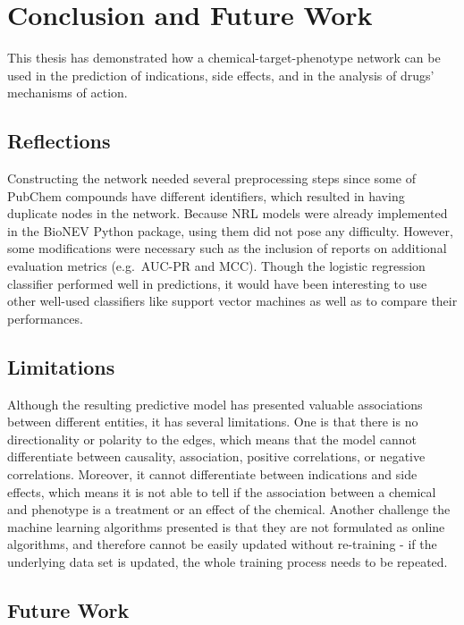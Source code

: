 \chapter{Conclusion and Future Work}
\label{conclusion}

This thesis has demonstrated how a chemical-target-phenotype network can be used in the prediction of indications, side effects, and in the analysis of drugs' mechanisms of action.

\section{Reflections}

Constructing the network needed several preprocessing steps since some of PubChem compounds have different identifiers, which resulted in having duplicate nodes in the network.
Because \ac{NRL} models were already implemented in the BioNEV Python package, using them did not pose any difficulty.
However, some modifications were necessary such as the inclusion of reports on additional evaluation metrics (e.g.\ AUC-PR and \ac{MCC}).
Though the logistic regression classifier performed well in predictions, it would have been interesting to use other well-used classifiers like support vector machines as well as to compare their performances.

\section{Limitations}

Although the resulting predictive model has presented valuable associations between different entities, it has several limitations.
One is that there is no directionality or polarity to the edges, which means that the model cannot differentiate between causality, association, positive correlations, or negative correlations.
Moreover, it cannot differentiate between indications and side effects, which means it is not able to tell if the association between a chemical and phenotype is a treatment or an effect of the chemical.
Another challenge the machine learning algorithms presented is that they are not formulated as online algorithms, and therefore cannot be easily updated without re-training - if the underlying data set is updated, the whole training process needs to be repeated.

\section{Future Work}

